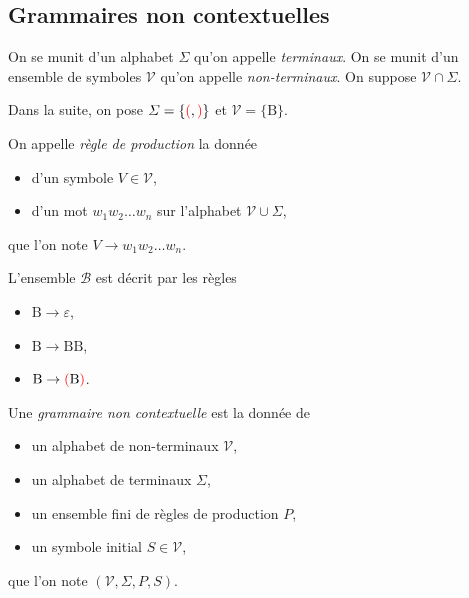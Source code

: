 \subsection{Grammaires non contextuelles}

\begin{defn}
	On se munit d'un alphabet $\Sigma$ qu'on appelle \textit{terminaux}. On se munit d'un ensemble de symboles $\mathcal{V}$ qu'on appelle \textit{non-terminaux}.
	On suppose $\mathcal{V} \cap \Sigma$.
\end{defn}

\begin{exm}
	Dans la suite, on pose $\varSigma = \{\mathord{{\color{red}(}},\mathord{{\color{red})}}\}$ et $\mathcal{V} = \{\mathrm{B}\}$.
\end{exm}

\begin{defn}
	On appelle \textit{règle de production} la donnée
	\begin{itemize}
		\item d'un symbole $V \in \mathcal{V}$,
		\item d'un mot $w_1 w_2 \ldots w_n$ sur l'alphabet $\mathcal{V} \cup \Sigma$,
	\end{itemize}
	que l'on note $V \to w_1w_2\ldots w_n$.
\end{defn}

\begin{exm}
	L'ensemble $\mathcal{B}$ est décrit par les règles
	\begin{itemize}
		\item $\mathrm{B} \to \varepsilon$,
		\item $\mathrm{B} \to \mathrm{BB}$,
		\item $\mathrm{B} \to \mathord{{\color{red}(}} \mathrm{B} \mathord{{\color{red})}}$.
	\end{itemize}
\end{exm}

\begin{defn}
	Une \textit{grammaire non contextuelle} est la donnée de
	\begin{itemize}
		\item un alphabet de non-terminaux $\mathcal{V}$,
		\item un alphabet de terminaux $\Sigma$,\footnotemark
		\item un ensemble fini de règles de production $P$,
		\item un symbole initial $S \in \mathcal{V}$,
	\end{itemize}
	que l'on note $(\mathcal{V}, \Sigma, P, S)$.
\end{defn}

